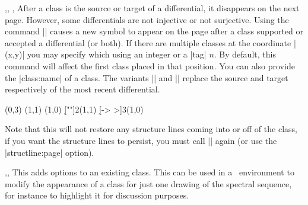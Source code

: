 \begin{sseqdata}[name = basic, cohomological Serre grading]
\begin{commandlist}{{\replaceclass\ooptions{}},\replaceclass\ooptions{}, \replacesource\ooptions, \replacetarget\ooptions}
After a class is the source or target of a differential, it disappears on the next page. However, some differentials are not injective or not surjective. Using the command |\replaceclass| causes a new symbol to appear on the page after a class supported or accepted a differential (or both). If there are multiple classes at the coordinate |(x,y)| you may specify which using an integer or a |tag| $n$. By default, this command will affect the first class placed in that position. You can also provide the |class:name| of a class. The variants |\replacesource| and |\replacetarget| replace the source and target respectively of the most recent differential.
\begin{codeexample}[]
\begin{sseqdata}[name = replace class example, Adams grading, classes = {draw = none } ]
\class["\mathbb{Z}"](0,3)
\class["\mathbb{Z}"](1,1)
\class["\mathbb{Z}"](1,0)
\d[""]2(1,1)
\replacetarget["\mathbb{Z}/2"] %
\d[-> >]3(1,0)
\replacesource["2\mathbb{Z}"]    %
\end{sseqdata}
\printpage[ name = replace class example, page = 2 ] \qquad
\printpage[ name = replace class example, page = 3 ] \qquad
\printpage[ name = replace class example, page = 4 ]
\end{codeexample}
Note that this will not restore any structure lines coming into or off of the class, if you want the structure lines to persist, you must call |\structline| again (or use the |structline:page| option).
\end{commandlist}

\begin{commandlist}{{\classoptions\moptions{}},\classoptions\moptions{}, \classoptions\moptions}
This adds options to an existing class. This can be used in a \sseqpageenv\  environment to modify the appearance of a class for just one drawing of the spectral sequence, for instance to highlight it for discussion purposes.


\end{commandlist}
\end{sseqdata}
